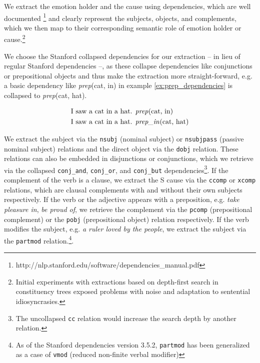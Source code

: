 We extract the emotion holder and the cause using dependencies, which are well documented \footnote{http://nlp.stanford.edu/software/dependencies\_manual.pdf} and clearly represent the subjects, objects, and complements, which we then map to their corresponding semantic role of emotion holder or cause.\footnote{Initial experiments with extractions based on depth-first search in constituency trees exposed problems with noise and adaptation to sentential idiosyncrasies.}

We choose the Stanford collapsed dependencies for our extraction -- in lieu of regular Stanford dependencies --, as these collapse dependencies like conjunctions or prepositional objects and thus make the extraction more straight-forward, e.g. a basic dependency like \textit{prep}(cat, in) in example \ref{ex:prep_dependencies} is collapsed to \textit{prep}(cat, hat).

\begin{align}
\begin{split}\label{ex:prep_dependencies}
&\textnormal{I saw a cat in a hat. \textit{prep}(cat, in)}\\
&\textnormal{I saw a cat in a hat. \textit{prep\_in}(cat, hat)}
\end{split}
\end{align}

We extract the subject via the \texttt{nsubj} (nominal subject) or \texttt{nsubjpass} (passive nominal subject) relations and the direct object via the \texttt{dobj} relation. These relations can also be embedded in disjunctions or conjunctions, which we retrieve via the collapsed \texttt{conj\_and}, \texttt{conj\_or}, and \texttt{conj\_but} dependencies\footnote{The uncollapsed \texttt{cc} relation would increase the search depth by another relation.}. If the complement of the verb is a clause, we extract the S cause via the \texttt{ccomp} or \texttt{xcomp} relations, which are clausal complements with and without their own subjects respectively. If the verb or the adjective appears with a preposition, e.g. \textit{take pleasure in}, \textit{be proud of}, we retrieve the complement via the \texttt{pcomp} (prepositional complement) or the \texttt{pobj} (prepositional object) relation respectively. If the verb modifies the subject, e.g. \textit{a ruler loved by the people}, we extract the subject via the \texttt{partmod} relation.\footnote{As of the Stanford dependencies version 3.5.2, \texttt{partmod} has been generalized as a case of \texttt{vmod} (reduced non-finite verbal modifier)}.

